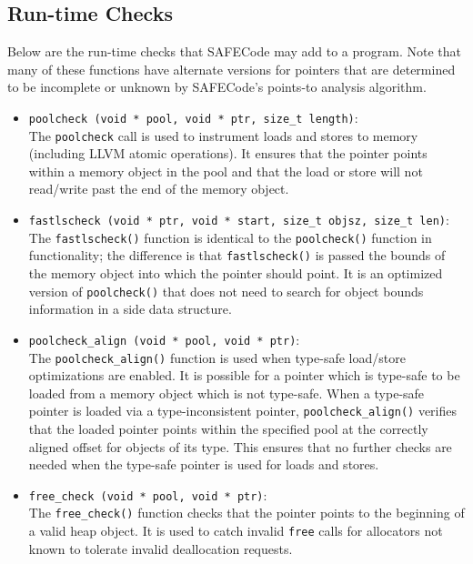 \subsection{Run-time Checks}
\label{section:checks:checks}

Below are the run-time checks that SAFECode may add to a program.
Note that many of these functions have alternate versions for pointers
that are determined to be incomplete or unknown by SAFECode's
points-to analysis algorithm.

\begin{itemize}
\item{\tt poolcheck (void * pool, void * ptr, size\_t length)}: \\
The {\tt poolcheck} call is used to instrument loads and stores to
memory (including LLVM atomic operations).  It ensures that the
pointer points within a memory object in the pool and that the load or
store will not read/write past the end of the memory object.

\item{\tt fastlscheck (void * ptr, void * start, size\_t objsz,
size\_t len)}: \\
The {\tt fastlscheck()} function is identical to the {\tt poolcheck()}
function in functionality; the difference is that {\tt fastlscheck()}
is passed the bounds of the memory object into which the pointer
should point.  It is an optimized version of {\tt poolcheck()} that
does not need to search for object bounds information in a side data
structure.

\item{\tt poolcheck\_align (void * pool, void * ptr)}: \\
The {\tt poolcheck\_align()} function is used when type-safe
load/store optimizations are enabled.  It is possible for a pointer which
is type-safe to be loaded from a memory object which is not type-safe.
When a type-safe pointer is loaded via a type-inconsistent pointer,
{\tt poolcheck\_align()} verifies that the loaded pointer points
within the specified pool at the correctly aligned offset for objects
of its type.  This ensures that no further checks are needed when the
type-safe pointer is used for loads and stores.

\item{\tt free\_check (void * pool, void * ptr)}: \\
The {\tt free\_check()} function checks that the pointer points to
the beginning of a valid heap object.  It is used to catch invalid
{\tt free} calls for allocators not known to tolerate invalid
deallocation requests.


\end{itemize}
